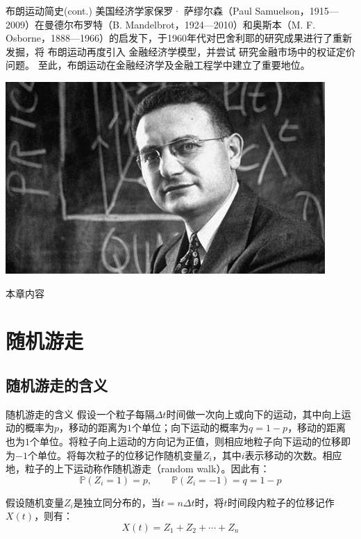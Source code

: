 \documentclass[t]{beamer}
\renewcommand{\Pr}{\mathbb{P}}
\begin{document}
\begin{frame}{布朗运动简史(cont.)}
  美国经济学家保罗· 萨缪尔森（Paul Samuelson，1915---2009）在曼德尔布罗特（B. Mandelbrot，1924---2010）和奥斯本（M. F. Osborne，1888---1966）的启发下，于1960年代对巴舍利耶的研究成果进行了重新发掘，将
布朗运动再度引入
金融经济学模型，并尝试
研究金融市场中的权证定价问题。
至此，布朗运动在金融经济学及金融工程学中建立了重要地位。
\begin{center}
  \includegraphics[scale=.5]{fig/Samuelson.jpg}
\end{center}
\end{frame}

\begin{frame}{本章内容}\small
\begin{spacing}{1.2}
  \begin{multicols}{2}
    \tableofcontents
  \end{multicols} 
\end{spacing} 
\end{frame}


\section{随机游走}

\subsection{随机游走的含义}


\begin{frame}{随机游走的含义}
  假设一个粒子每隔$\Delta t$时间做一次向上或向下的运动，其中向上运动的概率为$p$，移动的距离为$1$个单位；向下运动的概率为$q=1-p$，移动的距离也为$1$个单位。将粒子向上运动的方向记为正值，则相应地粒子向下运动的位移即为$-1$个单位。将每次粒子的位移记作随机变量$Z_i$，其中$i$表示移动的次数。相应地，粒子的上下运动称作随机游走（random walk）。因此有：
  \begin{equation*}
  \Pr(Z_i=1)=p,\qquad \Pr(Z_i=-1)=q=1-p
  \end{equation*}
  
  假设随机变量$Z_i$是独立同分布的，当$t=n\Delta t$时，将$t$时间段内粒子的位移记作$X(t)$，则有：
  \begin{equation*}
  X(t)=Z_1+Z_2+\cdots +Z_n
  \end{equation*}
\end{frame}
\end{document}
